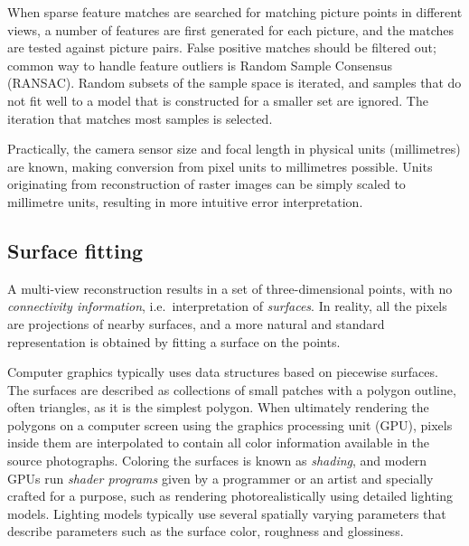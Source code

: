 
When sparse feature matches are searched for matching picture points in different views, a number of features are first generated for each picture, and the matches are tested against picture pairs.
False positive matches should be filtered out; common way to handle feature outliers is Random Sample Consensus (RANSAC).
Random subsets of the sample space is iterated, and samples that do not fit well to a model that is constructed for a smaller set are ignored.
The iteration that matches most samples is selected. \cite{hartley03multiview}


Practically, the camera sensor size and focal length in physical units (millimetres) are known, making conversion from pixel units to millimetres possible.
Units originating from reconstruction of raster images can be simply scaled to millimetre units, resulting in more intuitive error interpretation.




\subsection{Surface fitting} %

A multi-view reconstruction results in a set of three-dimensional points, with no \emph{connectivity information}, i.e.\ interpretation of \emph{surfaces}.
In reality, all the pixels are projections of nearby surfaces, and a more natural and standard representation is obtained by fitting a surface on the points.

Computer graphics typically uses data structures based on piecewise surfaces.
The surfaces are described as collections of small patches with a polygon outline, often triangles, as it is the simplest polygon.
When ultimately rendering the polygons on a computer screen using the graphics processing unit (GPU), pixels inside them are interpolated to contain all color information available in the source photographs.
Coloring the surfaces is known as \emph{shading}, and modern GPUs run \emph{shader programs} given by a programmer or an artist and specially crafted for a purpose, such as rendering photorealistically using detailed lighting models.
Lighting models typically use several spatially varying parameters that describe parameters such as the surface color, roughness and glossiness.

